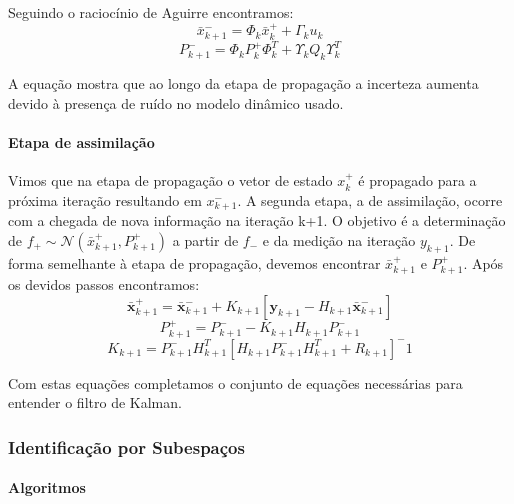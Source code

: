 Seguindo o raciocínio de  Aguirre encontramos:
\begin{equation}
\bar{x}^-_{k+1}=\Phi_k\bar{x}^+_k+\Gamma_ku_k
\end{equation}
\begin{equation}
P^-_{k+1}=\Phi_kP^+_k\Phi^T_k+\Upsilon_kQ_k\Upsilon^T_k
\end{equation}

A equação mostra que ao longo da etapa de propagação a incerteza aumenta devido à presença de ruído no modelo dinâmico usado.

\paragraph{Etapa de assimilação}
Vimos que na etapa de propagação o vetor de estado $x^+_k$ é propagado para a próxima iteração resultando em $x^-_{k+1}$. A segunda etapa, a de assimilação, ocorre com a chegada de nova informação na iteração k+1. O objetivo é a determinação de $f_+ \sim \mathcal{N} (\bar{x}^+_{k+1},P^+_{k+1})$ a partir de $f_-$ e da medição na iteração $y_{k+1}$. De forma semelhante à etapa de propagação, devemos encontrar $\bar{x}^+_{k+1}$ e $P^+_{k+1}$. Após os devidos passos encontramos:
\begin{equation}
\bar{\mathbf{x}}^+_{k+1}=\bar{\mathbf{x}}^-_{k+1}+K_{k+1}[\mathbf{y}_{k+1}-H_{k+1} \bar{\mathbf{x}} ^-_{k+1}]
\end{equation}
\begin{equation}
P^+_{k+1}=P^-_{k+1}-K_{k+1} H_{k+1} P^-_{k+1}
\end{equation}
\begin{equation}
K_{k+1}=P^-_{k+1} H^T_{k+1}[H_{k+1} P^-_{k+1} H^T_{k+1}+R_{k+1}]^-1
\end{equation}

Com estas equações completamos o conjunto de equações necessárias para entender o filtro de Kalman.

\subsubsection {Identificação por Subespaços}
\paragraph{Algoritmos}

